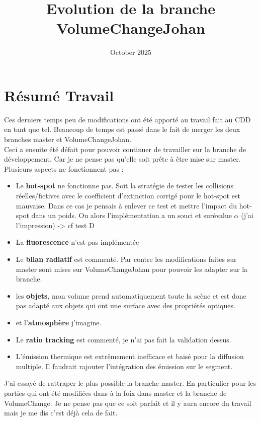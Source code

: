 
\usepackage[style=authoryear, backend=biber]{biblatex}
\graphicspath{{~/CESBIO/outputs/}}

\usepackage{hyperref}


\title{Evolution de la branche VolumeChangeJohan}
\date{October 2025}

\maketitle{}
\section{Résumé Travail}
Ces derniers temps peu de modifications ont été apporté au travail fait au CDD en tant que tel. Beaucoup de temps est passé dans le fait de merger les deux branches master et VolumeChangeJohan. \\
Ceci a ensuite été défait pour pouvoir continuer de travailler sur la branche de développement. Car je ne pense pas qu'elle soit prête à être mise sur master. Plusieurs aspects ne fonctionnent pas :
\begin{itemize}
	\item Le \textbf{hot-spot} ne fonctionne pas. Soit la stratégie de tester les collisions réelles/fictives avec le coefficient d'extinction corrigé pour le hot-spot est mauvaise. Dans ce cas je pensais à enlever ce test et mettre l'impact du hot-spot dans un poids. Ou alors l'implémentation a un souci et surévalue $\alpha$ (j'ai l'impression) -> cf test D
	\item La \textbf{fluorescence} n'est pas implémentée
	\item Le \textbf{bilan radiatif} est commenté. Par contre les modifications faites sur master sont mises sur VolumeChangeJohan pour pouvoir les adapter sur la branche. 
	\item les \textbf{objets}, mon volume prend automatiquement toute la scène et est donc pas adapté aux objets qui ont une surface avec des propriétés optiques. 
	\item et l'\textbf{atmosphère} j'imagine.
	\item Le \textbf{ratio tracking} est commenté, je n'ai pas fait la validation dessus. 
	\item L'émission thermique est extrêmement inefficace et baisé pour la diffusion multiple. Il faudrait rajouter l'intégration des émission sur le segment.
	
\end{itemize}
J'ai essayé de rattraper le plus possible la branche master. En particulier pour les parties qui ont été modifiées dans à la foix dans master et la branche de VolumeChange. Je ne pense pas que ce soit parfait et il y aura encore du travail mais je  me dis c'est déjà cela de fait. \\

